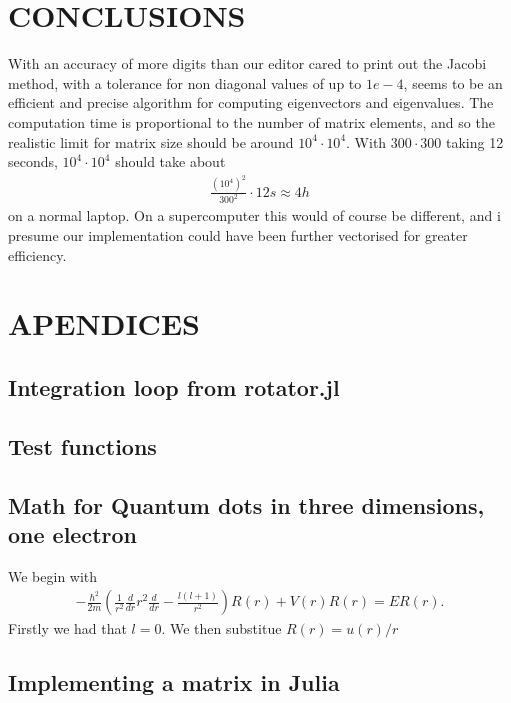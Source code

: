 \documentclass[a4paper]{article}
\begin{document}
\section{CONCLUSIONS}
With an accuracy of more digits than our editor cared to print out the Jacobi method, with a tolerance for non diagonal values of up to $1e-4$, seems to be an efficient and precise algorithm for computing eigenvectors and eigenvalues. The computation time is proportional to the number of matrix elements, and so the realistic limit for matrix size should be around $10^4 \cdot 10^4$. With $300 \cdot 300$ taking 12 seconds, $10^4 \cdot 10^4$ should take about
\begin{align}
\frac{(10^4)^2}{300^2}\cdot 12s\approx 4h
\end{align}
on a normal laptop. On a supercomputer this would of course be different, and i presume our implementation could have been further vectorised for greater efficiency.
\section{APENDICES}
\subsection{Integration loop from rotator.jl}\label{rotator.jl}

\subsection{Test functions}\label{opp_c.jl}

\subsection{Math for Quantum dots in three dimensions, one electron}\label{opp d math}
We begin with 
\begin{align}
- \frac{\hbar^2}{2m} \left( \frac{1}{r^2} \frac{d}{dr} r^2 \frac{d}{dr} - \frac{l(l+1)}{r^2}\right) R(r) + V(r) R(r) = ER(r).
\end{align}
Firstly we had that $l=0$. We then substitue $R(r) = u(r)/r$


\subsection{Implementing a matrix in Julia}\label{opp_d matrix}

\end{document}
